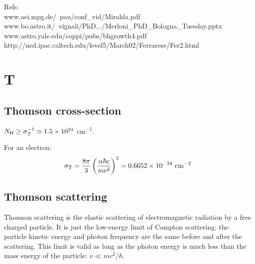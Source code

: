 \documentclass[11pt]{article}
\begin{document}
Refs:\\
www.aei.mpg.de/~pau/conf\_vid/Miralda.pdf\\
www.bo.astro.it/~vignali/PhD.../Merloni\_PhD\_Bologna\_Tuesday.pptx
www.astro.yale.edu/coppi/pubs/bhgrowth4.pdf
http://ned.ipac.caltech.edu/level5/March02/Ferrarese/Fer2.html

\section{T} 
\subsection{Thomson cross-section}
$N_{\rm H} \geq \sigma_{\rm T}^{-1} \simeq 1.5 \times 10^{24}$ cm$^{-2}$. 

For an electron:
\begin{equation}
\sigma_{\rm T}= \frac{8\pi}{3} \left(\frac{\alpha\hbar c}{mc^2}\right)^2 = 0.6652\times10^{-24} \,\, \rm{cm}^{-2}
\end{equation}

\subsection{Thomson scattering} 
Thomson scattering is the elastic scattering of electromagnetic radiation by a free charged particle. It is just the low-energy limit of Compton scattering: the particle kinetic energy and photon frequency are the same before and after the scattering. This limit is valid as long as the photon energy is much less than the mass energy of the particle: $\nu\ll mc^2/h$.



\end{document}

